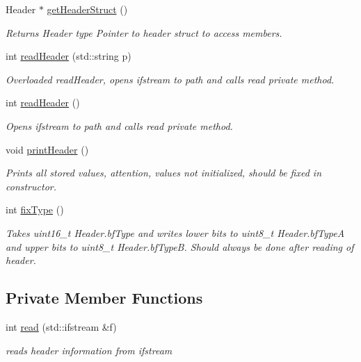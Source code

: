 \begin{DoxyCompactItemize}
Header $\ast$ \mbox{\hyperlink{classBitmapHeader_a7ac69b70fce7b54c9cd3134a0e68ea58}{get\+Header\+Struct}} ()
\begin{DoxyCompactList}\small\item\em Returns Header type Pointer to header struct to access members. \end{DoxyCompactList}\item 
int \mbox{\hyperlink{classBitmapHeader_a2de360d5111136167f5885bed561bc8c}{read\+Header}} (std\+::string p)
\begin{DoxyCompactList}\small\item\em Overloaded read\+Header, opens ifstream to path and calls read private method. \end{DoxyCompactList}\item 
int \mbox{\hyperlink{classBitmapHeader_a66adc11592dc1d18edbd46bade1db242}{read\+Header}} ()
\begin{DoxyCompactList}\small\item\em Opens ifstream to path and calls read private method. \end{DoxyCompactList}\item 
void \mbox{\hyperlink{classBitmapHeader_a72e26bdf3269d382dfbdc76119c1a6aa}{print\+Header}} ()
\begin{DoxyCompactList}\small\item\em Prints all stored values, attention, values not initialized, should be fixed in constructor. \end{DoxyCompactList}\item 
int \mbox{\hyperlink{classBitmapHeader_aa02e59db95074c6a96a44dac03cee77b}{fix\+Type}} ()
\begin{DoxyCompactList}\small\item\em Takes uint16\+\_\+t Header.\+bf\+Type and writes lower bits to uint8\+\_\+t Header.\+bf\+TypeA and upper bits to uint8\+\_\+t Header.\+bf\+TypeB. Should always be done after reading of header. \end{DoxyCompactList}\end{DoxyCompactItemize}
\subsection*{Private Member Functions}
\begin{DoxyCompactItemize}
\item 
int \mbox{\hyperlink{classBitmapHeader_aebc19bf8a908f1f7edfc5b10186c9db8}{read}} (std\+::ifstream \&f)
\begin{DoxyCompactList}\small\item\em reads header information from ifstream \end{DoxyCompactList}\end{DoxyCompactItemize}
